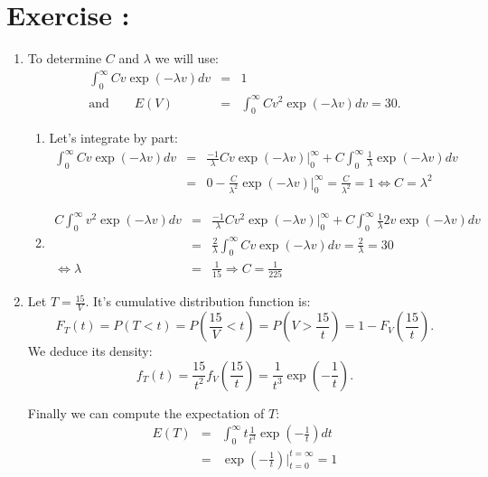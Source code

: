 \documentclass[12pt,thmsa]{article}\usepackage[]{graphicx}\usepackage[]{color}
\begin{document}
\addtocounter{section}{1}
\section*{Exercise \thesection:}


\begin{enumerate}
  \item To determine $C$ and $\lambda$ we will use:
  \begin{eqnarray*}
    \int_0^{\infty} C v \exp(-\lambda v)dv&=& 1 \\
    \text{and} \qquad E(V) &=& \int_0^{\infty} C v^2 \exp(-\lambda v)dv = 30.
  \end{eqnarray*}

\begin{enumerate}
  \item Let's integrate by part:
  \begin{eqnarray*}
    \int_0^{\infty} C v \exp(-\lambda v)dv &=& \frac{-1}{\lambda} Cv \exp(-\lambda v)\bigg\vert_0^\infty + C \int_0^\infty \frac{1}{\lambda} \exp(-\lambda v) dv\\
     &=&  0- \frac{C}{\lambda^2}  \exp(-\lambda v) \bigg\vert_0^\infty = \frac{C}{\lambda^2} =1  \Leftrightarrow C=\lambda^2
  \end{eqnarray*}

  \item
    \begin{eqnarray*}
    C \int_0^{\infty}  v^2 \exp(-\lambda v)dv &=& \frac{-1}{\lambda} Cv^2 \exp(-\lambda v)\bigg\vert_0^\infty + C \int_0^\infty \frac{1}{\lambda} 2v\exp(-\lambda v) dv\\
     &=&  \frac{2}{\lambda} \int_0^\infty C v\exp(-\lambda v) dv = \frac{2}{\lambda}= 30  \\
     \Leftrightarrow \lambda &=& \frac{1}{15}  \Rightarrow C=\frac{1}{225}
  \end{eqnarray*}
\end{enumerate}


  \item Let $T=\frac{15}{V}$. It's cumulative distribution function is:
  \begin{equation*}
  F_T(t)=P(T<t)=P\left(\frac{15}{V}<t\right)=P\left(V>\frac{15}{t}\right)=1-F_V\left(\frac{15}{t}\right).
  \end{equation*}
  We deduce its density:
  \begin{equation*}
  f_T(t)=\frac{15}{t^2}f_V\left(\frac{15}{t}\right)=\frac{1}{t^3} \exp\left(-\frac{1}{t}\right).
  \end{equation*}

  Finally we can compute the expectation of $T$:
  \begin{eqnarray*}
    E(T) &=& \int_0^\infty t \frac{1}{t^3} \exp\left(-\frac{1}{t}\right) dt \\
     &=& \exp\left(-\frac{1}{t}\right) \bigg\vert_{t=0}^{t=\infty}=1
  \end{eqnarray*}
\end{enumerate}
\end{document}
